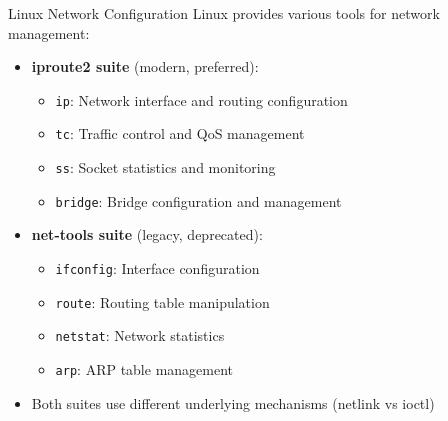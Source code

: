 \begin{definition}{Linux Network Configuration}
    Linux provides various tools for network management:
    \begin{itemize}
        \item \textbf{iproute2 suite} (modern, preferred):
            \begin{itemize}
                \item \texttt{ip}: Network interface and routing configuration
                \item \texttt{tc}: Traffic control and QoS management
                \item \texttt{ss}: Socket statistics and monitoring
                \item \texttt{bridge}: Bridge configuration and management
            \end{itemize}
        \item \textbf{net-tools suite} (legacy, deprecated):
            \begin{itemize}
                \item \texttt{ifconfig}: Interface configuration
                \item \texttt{route}: Routing table manipulation
                \item \texttt{netstat}: Network statistics
                \item \texttt{arp}: ARP table management
            \end{itemize}
        \item Both suites use different underlying mechanisms (netlink vs ioctl)
    \end{itemize}
\end{definition}

